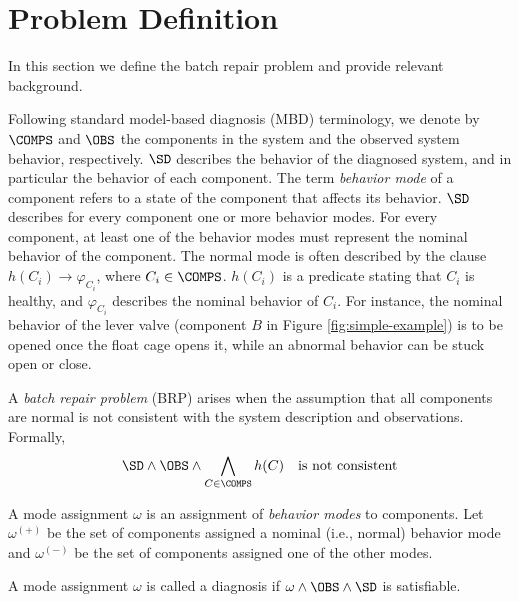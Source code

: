 
\section{Problem Definition}
In this section we define the batch repair problem and provide relevant background. 


Following standard model-based diagnosis (MBD) terminology, we denote by $\COMPS$ and $\OBS$ the components in the system and the observed system behavior, respectively. $\SD$ describes the behavior of the diagnosed system, and in particular the behavior of each component. The term {\em behavior mode} of a component refers to a state of the component that affects its behavior. $\SD$ describes for every component one or more behavior modes. For every component, at least one of the behavior modes must represent the nominal behavior of the component. The normal mode is often described by the clause $h(C_i) \rightarrow \varphi_{C_i}$, where $C_i\in \COMPS$. $h(C_i)$ is a predicate stating that $C_i$ is healthy, and $\varphi_{C_i}$ describes the nominal behavior of $C_i$. For instance, the nominal behavior of the lever valve (component $B$ in Figure \ref{fig:simple-example}) is to be opened once the float cage opens it, while an abnormal behavior can be stuck open or close.



A {\em batch repair problem} (BRP) arises when the assumption that all components are normal is not consistent with the system description and observations. Formally,
\[ \SD \wedge \OBS \wedge \bigwedge_{C\in \COMPS} h(C) ~~~ \text{is not consistent} \]





A mode assignment $\omega$ is an assignment of {\em behavior modes} to components. Let $\omega^{(+)}$ be the set of components assigned a nominal (i.e., normal) behavior mode and $\omega^{(-)}$ be the set of components assigned one of the other modes.


\begin{definition}[Diagnosis]
A mode assignment $\omega$ is called a diagnosis if $\omega \wedge \OBS \wedge \SD$ is satisfiable.
\end{definition}

